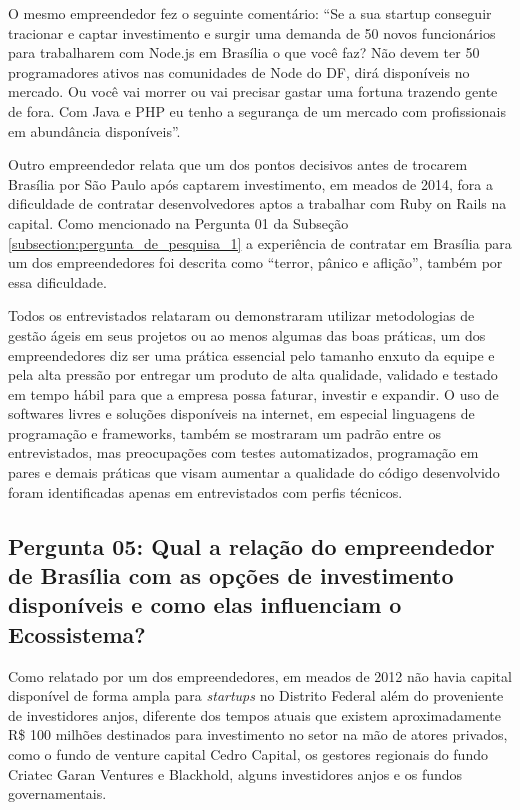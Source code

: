 O mesmo empreendedor fez o seguinte comentário: ``Se a sua startup conseguir tracionar e captar investimento e surgir uma demanda de 50 novos funcionários para trabalharem com Node.js em Brasília o que você faz? Não devem ter 50 programadores ativos nas comunidades de Node do DF, dirá disponíveis no mercado. Ou você vai morrer ou vai precisar gastar uma fortuna trazendo gente de fora. Com Java e PHP eu tenho a segurança de um mercado com profissionais em abundância disponíveis''.

Outro empreendedor relata que um dos pontos decisivos antes de trocarem Brasília por São Paulo após captarem investimento, em meados de 2014, fora a dificuldade de contratar desenvolvedores aptos a trabalhar com Ruby on Rails na capital. Como mencionado na Pergunta 01 da Subseção \ref{subsection:pergunta_de_pesquisa_1} a experiência de contratar em Brasília para um dos empreendedores foi descrita como ``terror, pânico e aflição'', também por essa dificuldade.

Todos os entrevistados relataram ou demonstraram utilizar metodologias de gestão ágeis em seus projetos ou ao menos algumas das boas práticas, um dos empreendedores diz ser uma prática essencial pelo tamanho enxuto da equipe e pela alta pressão por entregar um produto de alta qualidade, validado e testado em tempo hábil para que a empresa possa faturar, investir e expandir. O uso de softwares livres e soluções disponíveis na internet, em especial linguagens de programação e frameworks, também se mostraram um padrão entre os entrevistados, mas preocupações com testes automatizados, programação em pares e demais práticas que visam aumentar a qualidade do código desenvolvido foram identificadas apenas em entrevistados com perfis técnicos.

\subsection*{Pergunta 05: Qual a relação do empreendedor de Brasília com as opções de investimento disponíveis e como elas influenciam o Ecossistema?}
\label{subsection:pergunta_de_pesquisa_5}

Como relatado por um dos empreendedores, em meados de 2012 não havia capital disponível de forma ampla para \textit{startups} no Distrito Federal além do proveniente de investidores anjos, diferente dos tempos atuais que existem aproximadamente R\$ 100 milhões destinados para investimento no setor na mão de atores privados, como o fundo de venture capital Cedro Capital, os gestores regionais do fundo Criatec Garan Ventures e Blackhold, alguns investidores anjos e os fundos governamentais. 

